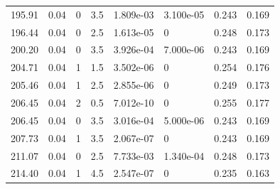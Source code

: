 \documentclass[preview]{standalone}
\begin{document}
{{{\begin{tabular}{L{1.2cm}C{1.2cm} C{0.3cm}C{0.5cm} C{1.4cm}C{1.4cm} C{1.4cm}C{1.4cm}}
  195.91  &  0.04  & 0     & 3.5 &  1.809e-03  & 3.100e-05  & 0.243 &  0.169   \\ 
  196.44  &  0.04  & 0     & 2.5 &  1.613e-05  & 0  & 0.248 &  0.173   \\ 
  200.20  &  0.04  & 0     & 3.5 &  3.926e-04  & 7.000e-06  & 0.243 &  0.169   \\ 
  204.71  &  0.04  & 1     & 1.5 &  3.502e-06  & 0  & 0.254 &  0.176   \\ 
  205.46  &  0.04  & 1     & 2.5 &  2.855e-06  & 0  & 0.249 &  0.173   \\ 
  206.45  &  0.04  & 2     & 0.5 &  7.012e-10  & 0  & 0.255 &  0.177   \\ 
  206.45  &  0.04  & 0     & 3.5 &  3.016e-04  & 5.000e-06  & 0.243 &  0.169   \\ 
  207.73  &  0.04  & 1     & 3.5 &  2.067e-07  & 0  & 0.243 &  0.169   \\ 
  211.07  &  0.04  & 0     & 2.5 &  7.733e-03  & 1.340e-04  & 0.248 &  0.173   \\ 
  214.40  &  0.04  & 1     & 4.5 &  2.547e-07  & 0  & 0.235 &  0.163   \\ 
\hline 
\end{tabular} 

}}}
\end{document}
